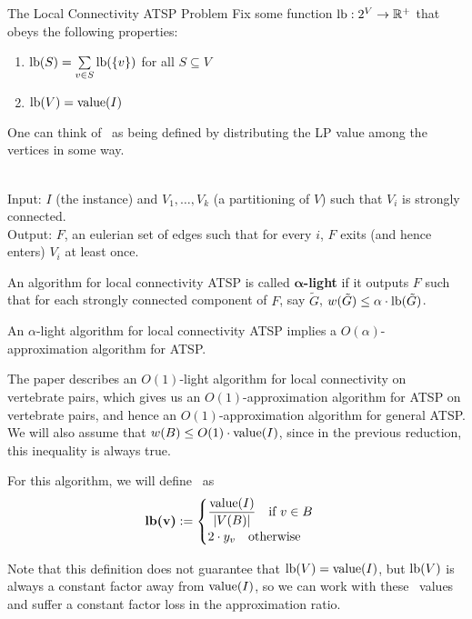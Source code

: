 \documentclass[./main.tex]{subfiles}
\begin{document}
\begin{subsection}{The Local Connectivity ATSP Problem}
	Fix some function $\textup{lb} : 2^V\rightarrow \mathbb{R}^+$ that obeys the following properties:
	\begin{enumerate}
		\item $\textup{lb}(S) = \sum\limits_{v\in S}\textup{lb}(\{v\})$ for all $S\subseteq V$
		\item $\textup{lb}(V) = \textup{value}(I)$
	\end{enumerate}
	One can think of \lb\ as being defined by distributing the LP value among the vertices in some way.\vspace{3mm}
	\begin{problem}
	\ \\Input: $I$ (the instance) and $V_1,\ldots,V_k$ (a partitioning of $V$) such that $V_i$ is strongly connected.
	\\Output: $F$, an eulerian set of edges such that for every $i$, $F$ exits (and hence enters) $V_i$ at least once.\end{problem}\vspace{4mm}
	\begin{definition}
		An algorithm for local connectivity ATSP is called $\bm{\alpha}$\textbf{-light} if it outputs $F$ such that for each strongly connected component of $F$, say $\tilde{G}$, $w(\tilde{G})\leq \alpha\cdot \textup{lb}(\tilde{G})$.
	\end{definition}\vspace{2mm}
	\begin{theorem}[Svensson '15] An $\alpha$-light algorithm for local connectivity ATSP implies a $O(\alpha)$-approximation algorithm for ATSP.
	\end{theorem}
	The paper describes an $O(1)$-light algorithm for local connectivity on vertebrate pairs, which gives us an $O(1)$-approximation algorithm for ATSP on vertebrate pairs, and hence an $O(1)$-approximation algorithm for general ATSP.\vspace{2mm}
	\\We will also assume that $w(B)\leq O(1)\cdot \textup{value}(I)$, since in the previous reduction, this inequality is always true.
	\begin{definition}
		For this algorithm, we will define \lb\ as $$\textbf{\textup{lb}(v)}:=
		\begin{cases}
			\dfrac{\textup{value}(I)}{|V(B)|}\quad \text{if }v\in B \\
			2\cdot y_v\quad \text{otherwise}
		\end{cases}$$
	\end{definition}
	Note that this definition does not guarantee that $\textup{lb}(V) = \textup{value}(I)$, but $\textup{lb}(V)$ is always a constant factor away from $\textup{value}(I)$, so we can work with these \lb\ values and suffer a constant factor loss in the approximation ratio.\vspace{2mm}
	\end{subsection}
\end{document}
